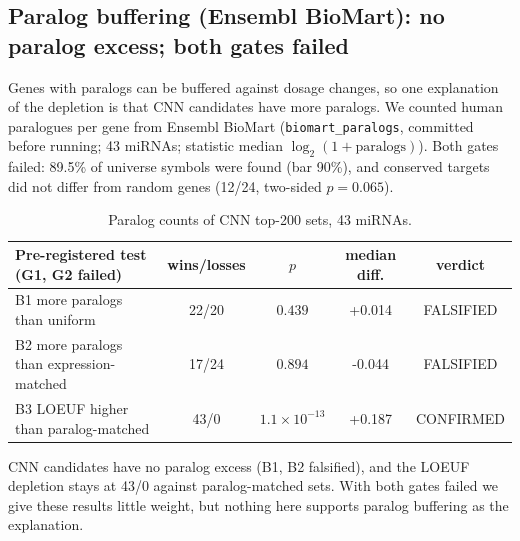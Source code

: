 \subsection{Paralog buffering (Ensembl BioMart): no paralog excess; both gates failed}
Genes with paralogs can be buffered against dosage changes, so one explanation of the depletion is that CNN candidates have more paralogs. We counted human paralogues per gene from Ensembl BioMart (\texttt{biomart\_paralogs}, committed before running; 43 miRNAs; statistic median $\log_2(1+\text{paralogs})$). Both gates failed: 89.5\% of universe symbols were found (bar 90\%), and conserved targets did not differ from random genes (12/24, two-sided $p=0.065$).
\begin{table}[h]\centering\small\begin{tabular}{lcccc}\hline Pre-registered test (G1, G2 failed) & wins/losses & $p$ & median diff. & verdict\\\hline
B1 more paralogs than uniform & 22/20 & $0.439$ & +0.014 & FALSIFIED \\
B2 more paralogs than expression-matched & 17/24 & $0.894$ & -0.044 & FALSIFIED \\
B3 LOEUF higher than paralog-matched & 43/0 & $1.1\times10^{-13}$ & +0.187 & CONFIRMED \\
\hline\end{tabular}\caption{Paralog counts of CNN top-200 sets, 43 miRNAs.}\label{tab:biomart}\end{table}
CNN candidates have no paralog excess (B1, B2 falsified), and the LOEUF depletion stays at 43/0 against paralog-matched sets. With both gates failed we give these results little weight, but nothing here supports paralog buffering as the explanation.
